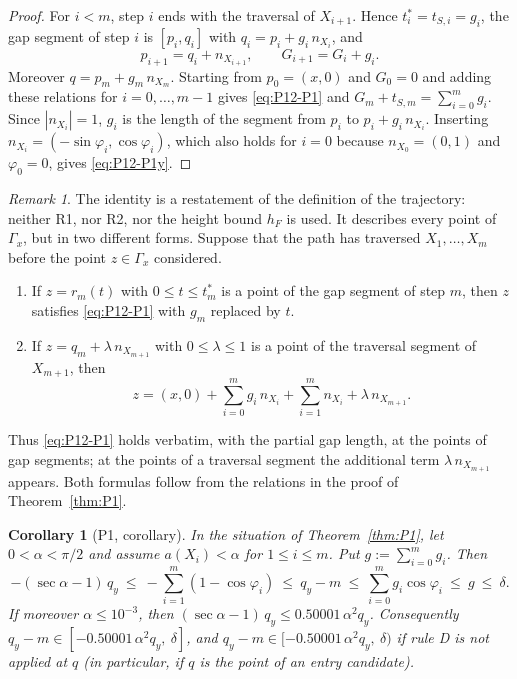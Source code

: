 \documentclass[11pt]{amsart}
\newtheorem{corollary}[theorem]{Corollary}
\theoremstyle{definition}
\theoremstyle{remark}
\newtheorem{remark}[theorem]{Remark}
\numberwithin{equation}{section}
\begin{document}
\begin{proof}
For $i<m$, step $i$ ends with the traversal of $X_{i+1}$. Hence $t^*_i=t_{S,i}=g_i$, the gap segment of step $i$ is $[p_i,q_i]$ with $q_i=p_i+g_i\,n_{X_i}$, and
\[
p_{i+1}=q_i+n_{X_{i+1}},\qquad G_{i+1}=G_i+g_i .
\]
Moreover $q=p_m+g_m\,n_{X_m}$. Starting from $p_0=(x,0)$ and $G_0=0$ and adding these relations for $i=0,\dots,m-1$ gives \eqref{eq:P12-P1} and $G_m+t_{S,m}=\sum_{i=0}^mg_i$. Since $|n_{X_i}|=1$, $g_i$ is the length of the segment from $p_i$ to $p_i+g_i\,n_{X_i}$. Inserting $n_{X_i}=(-\sin\varphi_i,\cos\varphi_i)$, which also holds for $i=0$ because $n_{X_0}=(0,1)$ and $\varphi_0=0$, gives \eqref{eq:P12-P1y}.
\end{proof}

\begin{remark}\label{rem:P12-points}
The identity is a restatement of the definition of the trajectory: neither R1, nor R2, nor the height bound $h_F$ is used. It describes every point of $\Gamma_x$, but in two different forms. Suppose that the path has traversed $X_1,\dots,X_m$ before the point $z\in\Gamma_x$ considered.
\begin{enumerate}[label=\textup{(\alph*)}]
\item If $z=r_m(t)$ with $0\le t\le t^*_m$ is a point of the gap segment of step $m$, then $z$ satisfies \eqref{eq:P12-P1} with $g_m$ replaced by $t$.
\item If $z=q_m+\lambda\,n_{X_{m+1}}$ with $0\le\lambda\le1$ is a point of the traversal segment of $X_{m+1}$, then
\[
z=(x,0)+\sum_{i=0}^mg_i\,n_{X_i}+\sum_{i=1}^mn_{X_i}+\lambda\,n_{X_{m+1}}.
\]
\end{enumerate}
Thus \eqref{eq:P12-P1} holds verbatim, with the partial gap length, at the points of gap segments; at the points of a traversal segment the additional term $\lambda\,n_{X_{m+1}}$ appears. Both formulas follow from the relations in the proof of Theorem~\ref{thm:P1}.
\end{remark}

\begin{corollary}[P1, corollary]\label{cor:P1}
In the situation of Theorem~\ref{thm:P1}, let $0<\alpha<\pi/2$ and assume $a(X_i)<\alpha$ for $1\le i\le m$. Put $g:=\sum_{i=0}^mg_i$. Then
\begin{equation}\label{eq:P12-cor}
-(\sec\alpha-1)\,q_y\ \le\ -\sum_{i=1}^m(1-\cos\varphi_i)\ \le\ q_y-m\ \le\ \sum_{i=0}^mg_i\cos\varphi_i\ \le\ g\ \le\ \delta .
\end{equation}
If moreover $\alpha\le10^{-3}$, then $(\sec\alpha-1)\,q_y\le0.50001\,\alpha^2q_y$. Consequently $q_y-m\in[-0.50001\,\alpha^2q_y,\ \delta]$, and $q_y-m\in[-0.50001\,\alpha^2q_y,\ \delta)$ if rule D is not applied at $q$ \textup{(}in particular, if $q$ is the point of an entry candidate\textup{)}.
\end{corollary}
\end{document}
